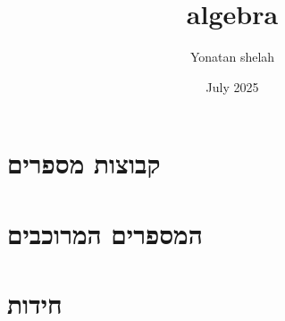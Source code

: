 \documentclass{book} %
\title{algebra}
\author{Yonatan shelah}
\date{July 2025}
\begin{document}
\maketitle

\renewcommand{\thechapter}{\Roman{chapter}} %
\setcounter{chapter}{0} %

\chapter{קבוצות מספרים}
\chapter{המספרים המרוכבים}

\renewcommand{\thechapter}{\arabic{chapter}} %
\setcounter{chapter}{0} %
\chapter{חידות}
\end{document}
